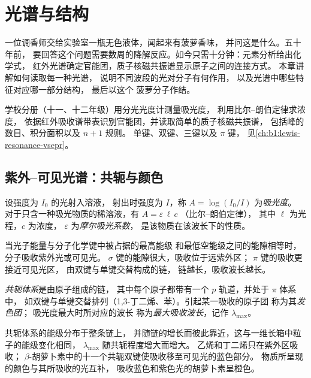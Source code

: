 \chapter{光谱与结构}\label{ch:b1:structure-spectroscopy}

一位调香师交给实验室一瓶无色液体，闻起来有菠萝香味，
并问这是什么。五十年前，
要回答这个问题需要数周的降解反应。如今只需十分钟：元素分析给出化学式，
红外光谱确定官能团，质子核磁共振谱显示原子之间的连接方式。
本章讲解如何读取每一种光谱，
说明不同波段的光对分子有何作用，
以及光谱中哪些特征对应哪一部分结构，
最后以这个
菠萝分子作结。

\begin{recall}
学校分册（十一、十二年级）用分光光度计测量吸光度，
利用比尔–朗伯定律求浓度，
依据红外吸收谱带表识别官能团，并读取简单的质子核磁共振谱，
包括峰的数目、积分面积以及 $n + 1$ 规则。
单键、双键、三键以及 $\pi$ 键，
见\cref{ch:b1:lewis-resonance-vsepr}。
\end{recall}

\section{紫外–可见光谱：共轭与颜色}

\begin{definition}\label{def:b1:structure-spectroscopy:absorbance}
设强度为 $I_0$ 的光射入溶液，
射出时强度为 $I$，称 $A = \log(I_0/I)$ 为\emph{吸光度}。
对于只含一种吸光物质的稀溶液，有 $A = \varepsilon\,\ell\,c$
（比尔–朗伯定律），
其中 $\ell$ 为光程，$c$ 为浓度，
$\varepsilon$ 为\emph{摩尔吸光系数}，
是该物质在该波长下的性质。
\end{definition}

当光子能量与分子化学键中被占据的最高能级
和最低空能级之间的能隙相等时，分子吸收紫外光或可见光。
$\sigma$ 键的能隙很大，吸收位于远紫外区；
$\pi$ 键的吸收更接近可见光区，
由双键与单键交替构成的链，
链越长，吸收波长越长。

\begin{definition}\label{def:b1:structure-spectroscopy:conjugation}
\emph{共轭体系}是由原子组成的链，
其中每个原子都带有一个 $p$ 轨道，并处于 $\pi$ 体系中，
如双键与单键交替排列（1,3-丁二烯、苯）。引起某一吸收的原子团
称为其\emph{发色团}；
吸光度最大时所对应的波长
称为\emph{最大吸收波长}，记作 $\lambda_{\max}$。
\end{definition}

共轭体系的能级分布于整条链上，
并随链的增长而彼此靠近，这与一维长箱中粒子的能级变化相同，
$\lambda_{\max}$ 随共轭程度增大而增大。
乙烯和丁二烯只在紫外区吸收；
$\beta$-胡萝卜素中的十一个共轭双键使吸收移至可见光的蓝色部分。
物质所呈现的颜色与其所吸收的光互补，
吸收蓝色和紫色光的胡萝卜素呈橙色。

